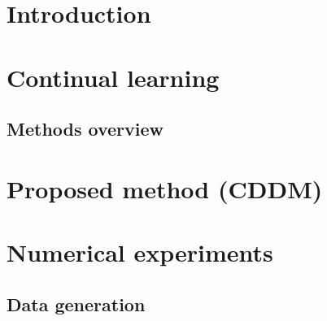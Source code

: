 \documentclass[a4paper,fleqn]{cas-sc}
\begin{document}




\section{Introduction}\label{sec:intro}
  
\section{Continual learning}\label{sec:cl}

\subsection{Methods overview}\label{subsec:overview}

\section{Proposed method (CDDM)}\label{sec:method}

\section{Numerical experiments}\label{sec:numerical_exp}

\subsection{Data generation}\label{subsec:data}
\end{document}
